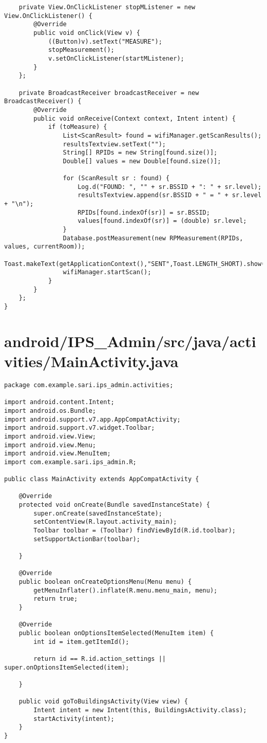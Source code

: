 \begin{lstlisting}
    private View.OnClickListener stopMListener = new View.OnClickListener() {
        @Override
        public void onClick(View v) {
            ((Button)v).setText("MEASURE");
            stopMeasurement();
            v.setOnClickListener(startMListener);
        }
    };

    private BroadcastReceiver broadcastReceiver = new BroadcastReceiver() {
        @Override
        public void onReceive(Context context, Intent intent) {
            if (toMeasure) {
                List<ScanResult> found = wifiManager.getScanResults();
                resultsTextview.setText("");
                String[] RPIDs = new String[found.size()];
                Double[] values = new Double[found.size()];

                for (ScanResult sr : found) {
                    Log.d("FOUND: ", "" + sr.BSSID + ": " + sr.level);
                    resultsTextview.append(sr.BSSID + " = " + sr.level + "\n");
                    RPIDs[found.indexOf(sr)] = sr.BSSID;
                    values[found.indexOf(sr)] = (double) sr.level;
                }
                Database.postMeasurement(new RPMeasurement(RPIDs, values, currentRoom));
                Toast.makeText(getApplicationContext(),"SENT",Toast.LENGTH_SHORT).show();
                wifiManager.startScan();
            }
        }
    };
}
\end{lstlisting}
\newpage
\section{android/IPS\_Admin/src/java/activities/MainActivity.java}
\begin{lstlisting}package com.example.sari.ips_admin.activities;

import android.content.Intent;
import android.os.Bundle;
import android.support.v7.app.AppCompatActivity;
import android.support.v7.widget.Toolbar;
import android.view.View;
import android.view.Menu;
import android.view.MenuItem;
import com.example.sari.ips_admin.R;

public class MainActivity extends AppCompatActivity {

    @Override
    protected void onCreate(Bundle savedInstanceState) {
        super.onCreate(savedInstanceState);
        setContentView(R.layout.activity_main);
        Toolbar toolbar = (Toolbar) findViewById(R.id.toolbar);
        setSupportActionBar(toolbar);

    }

    @Override
    public boolean onCreateOptionsMenu(Menu menu) {
        getMenuInflater().inflate(R.menu.menu_main, menu);
        return true;
    }

    @Override
    public boolean onOptionsItemSelected(MenuItem item) {
        int id = item.getItemId();

        return id == R.id.action_settings || super.onOptionsItemSelected(item);

    }

    public void goToBuildingsActivity(View view) {
        Intent intent = new Intent(this, BuildingsActivity.class);
        startActivity(intent);
    }
}
\end{lstlisting}
\newpage

